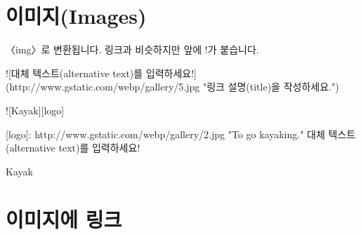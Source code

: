 \documentclass[12pt, a4paper, oneside]{book}
\let\stdsection\section
\renewcommand\section{\newpage\stdsection}
\begin{document}
				\section{이미지(Images)}
	
	〈img〉로 변환됩니다.
	링크과 비슷하지만 앞에 !가 붙습니다.
	
	![대체 텍스트(alternative text)를 입력하세요!](http://www.gstatic.com/webp/gallery/5.jpg "링크 설명(title)을 작성하세요.")
	
	![Kayak][logo]
	
	[logo]: http://www.gstatic.com/webp/gallery/2.jpg "To go kayaking."
	대체 텍스트(alternative text)를 입력하세요!
	
	Kayak
			
				\section{이미지에 링크}
%			
%			
%			
%			
\end{document}
